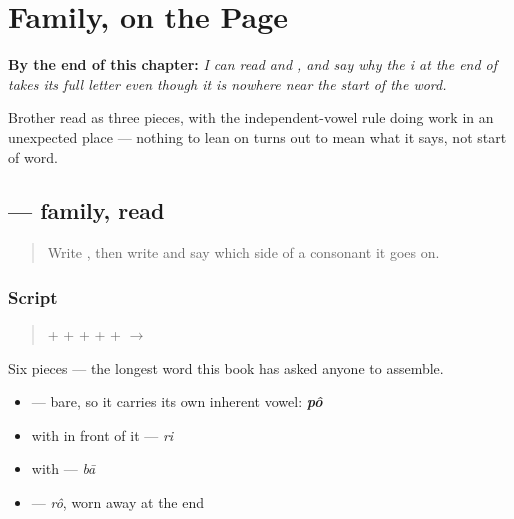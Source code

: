 
\chapter{Family, on the Page}
\label{ch:bn-family-on-the-page}

\begin{chapteropening}
\textbf{By the end of this chapter:} \emph{I can read  and , and say why the i at the end of  takes its full letter even though it is nowhere near the start of the word.}

Brother read as three pieces, with the independent-vowel rule doing work in an unexpected place — nothing to lean on turns out to mean what it says, not start of word.
\end{chapteropening}

\section[pôribār]{ — family, read}

\label{lesson:BN-W04-poribar-read}



\begin{quote}
Write \textbf{}, then write \textbf{} and say which side of a consonant it goes on.
\end{quote}

\subsection*{Script}
\begin{quote}
\textbf{} + \textbf{} + \textbf{} + \textbf{} + \textbf{} + \textbf{} $\to$ \textbf{}
\end{quote}

Six pieces — the longest word this book has asked anyone to assemble.

\begin{itemize}
\raggedright
  \item \textbf{} — bare, so it carries its own inherent vowel: \emph{\textbf{pô}}
  \item \textbf{} with \textbf{} in front of it — \emph{ri}
  \item \textbf{} with \textbf{} — \emph{bā}
  \item \textbf{} — \emph{rô}, worn away at the end
\end{itemize}


